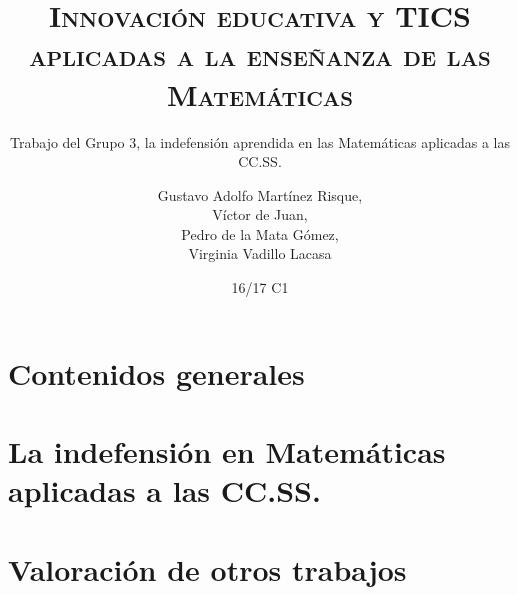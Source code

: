 \documentclass[palatino,nochap,miniheader,nobuilddate]{apuntesURJC}
\title{\textsc{Innovación educativa y TICS aplicadas a la enseñanza de las Matemáticas}}
\subtitle{Trabajo del Grupo 3, la indefensión aprendida en las Matemáticas aplicadas a las CC.SS.}
\author{
Gustavo Adolfo Martínez Risque,\\
Víctor de Juan,\\
Pedro de la Mata Gómez,\\
Virginia Vadillo Lacasa}
\date{16/17 C1}
\begin{document}
\pagestyle{plain}



\maketitle
\leavevmode\thispagestyle{empty}\newpage
\tableofcontents
\newpage

\chapter{Contenidos generales}


\chapter{La indefensión en Matemáticas aplicadas a las CC.SS.}


\chapter{Valoración de otros trabajos}


\printindex
\end{document}
